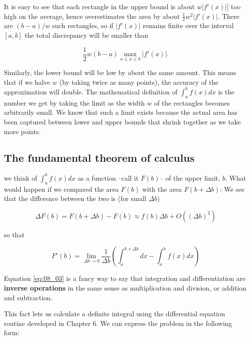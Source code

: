 It is easy to see that each rectangle in the upper bound is about $w\lvert f'(x)\rvert]$ too high on the average, hence overestimates the area by about $\frac{1}{2}w^2\lvert f'(x)\rvert$. There are $(b-a)/w$ such rectangles, so if $\lvert f'(x)\rvert$ remains finite over the interval $[a, b]$ the total discrepancy will be smaller than

\begin{equation*}
\frac{1}{2}w(b-a) \max_{a\leq x \leq b} \lvert f'(x)\rvert.
\end{equation*}

Similarly, the lower bound will be low by about the same amount. This means that if we halve $w$ (by taking twice as many points), the accuracy of the approximation will double. The mathematical definition of $\int_{a}^{b} f(x) dx$ is the number we get by taking the limit as the width $w$ of the rectangles becomes arbitrarily small. We know that such a limit exists because the actual area has been captured between lower and upper bounds that shrink together as we take more points.

\subsection{The fundamental theorem of calculus}
 we think of $\int_{a}^{b}f(x) dx$ as a function --call it $F(b)$-- of the upper limit, $b$. What would happen if we compared the area $F(b)$ with the area $F(b + \Delta b)$: We see that the difference between the two is (for small $\Delta b$)

\begin{equation}
\Delta F(b) = F(b+\Delta b) - F(b) \approx f(b)\Delta b + O((\Delta b)^2) 
\end{equation}

so that

\begin{equation}\label{eq:08_03}
F'(b) = \lim_{\Delta b \to 0} \frac{1}{\Delta b} \left(\int_{a}^{b+\Delta b} dx - \int_{a}^{b}f(x) dx \right)
\end{equation}

Equation \ref{eq:08_03} is a fancy way to say that integration and differentiation are \textbf{inverse operations} in the same sense as multiplication and division, or addition and subtraction.

This fact lets us calculate a definite integral using the differential equation routine developed in Chapter 6. We can express the problem in the following form:

